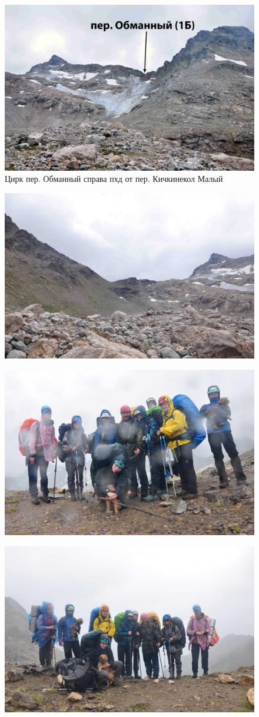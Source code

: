 \begin{figure}[h!]
	\centering
	\includegraphics[width=0.7\linewidth]{../pics/DSC_0227.JPG}
	\caption{Цирк пер. Обманный справа пхд от пер. Кичкинекол Малый}
	\label{fig:DSC_0227}
\end{figure}

\begin{figure}[h!]
	\centering
	\includegraphics[width=0.7\linewidth]{../pics/DSC_0230.JPG}
	\label{fig:DSC_0230}
\end{figure}

\begin{figure}[h!]
	\centering
	\includegraphics[angle=0, width=0.7\linewidth]{../pics/DSC_0239.JPG}
	\label{fig:DSC_0239}
\end{figure}

\begin{figure}[h!]
	\centering
	\includegraphics[angle=0, width=0.7\linewidth]{../pics/DSC_0242.JPG}
	\label{fig:DSC_0242}
\end{figure}

\newpage